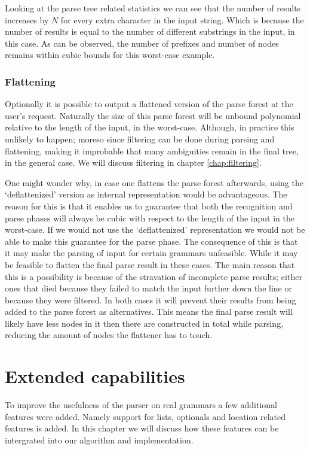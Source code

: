 \documentclass[a4paper,10pt]{article}
\begin{document}
Looking at the parse tree related statistics we can see that the number of results increases by $N$ for every extra character in the input string. Which is because the number of results is equal to the number of different substrings in the input, in this case. As can be observed, the number of prefixes and number of nodes remains within cubic bounds for this worst-case example.

\subsubsection{Flattening}
Optionally it is possible to output a flattened version of the parse forest at the user's request. Naturally the size of this parse forest will be unbound polynomial relative to the length of the input, in the worst-case. Although, in practice this unlikely to happen; moreso since filtering can be done during parsing and flattening, making it improbable that many ambiguities remain in the final tree, in the general case. We will discuss filtering in chapter \ref{chap:filtering}.

One might wonder why, in case one flattens the parse forest afterwards, using the `deflattenized' version as internal representation would be advantageous. The reason for this is that it enables us to guarantee that both the recognition and parse phases will always be cubic with respect to the length of the input in the worst-case. If we would not use the `deflattenized' representation we would not be able to make this guarantee for the parse phase. The consequence of this is that it may make the parsing of input for certain grammars unfeasible. While it may be feasible to flatten the final parse result in these cases. The main reason that this is a possibility is because of the stravation of incomplete parse results; either ones that died because they failed to match the input further down the line or because they were filtered. In both cases it will prevent their results from being added to the parse forest as alternatives. This means the final parse result will likely have less nodes in it then there are constructed in total while parsing, reducing the amount of nodes the flattener has to touch.

\section{Extended capabilities}

To improve the usefulness of the parser on real grammars a few additional features were added. Namely support for lists, optionals and location related features is added. In this chapter we will discuss how these features can be intergrated into our algorithm and implementation.
\end{document}
